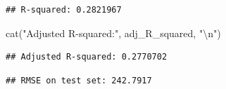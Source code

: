 \documentclass[
]{article}
\newenvironment{Shaded}{\begin{snugshade}}{\end{snugshade}}
\newcommand{\CommentTok}[1]{\textcolor[rgb]{0.56,0.35,0.01}{\textit{#1}}}
\newcommand{\DecValTok}[1]{\textcolor[rgb]{0.00,0.00,0.81}{#1}}
\newcommand{\FunctionTok}[1]{\textcolor[rgb]{0.00,0.00,0.00}{#1}}
\newcommand{\NormalTok}[1]{#1}
\newcommand{\OtherTok}[1]{\textcolor[rgb]{0.56,0.35,0.01}{#1}}
\newcommand{\SpecialCharTok}[1]{\textcolor[rgb]{0.00,0.00,0.00}{#1}}
\newcommand{\StringTok}[1]{\textcolor[rgb]{0.31,0.60,0.02}{#1}}
\begin{document}
\begin{verbatim}
## R-squared: 0.2821967
\end{verbatim}

\begin{Shaded}
\begin{Highlighting}[]
\FunctionTok{cat}\NormalTok{(}\StringTok{"Adjusted R{-}squared:"}\NormalTok{, adj\_R\_squared, }\StringTok{"}\SpecialCharTok{\textbackslash{}n}\StringTok{"}\NormalTok{)}
\end{Highlighting}
\end{Shaded}

\begin{verbatim}
## Adjusted R-squared: 0.2770702
\end{verbatim}

\begin{Shaded}
\end{Shaded}

\begin{verbatim}
## RMSE on test set: 242.7917
\end{verbatim}
\end{document}
